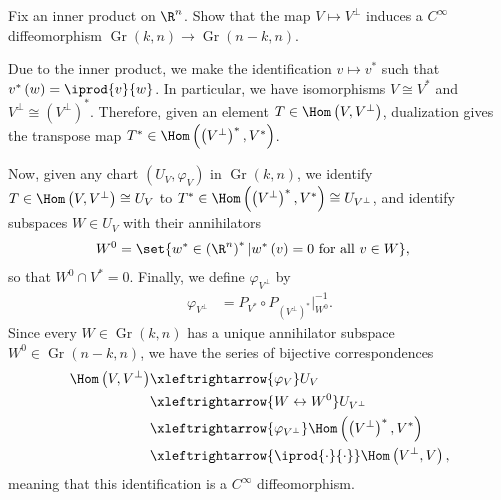 \documentclass[10pt]{mypackage}
\begin{document}
\begin{problem}[Problem 2]
  Fix an inner product on $\R^n$. Show that the map $V\mapsto V^{\perp}$ induces a $C^{\infty}$ diffeomorphism $\operatorname{Gr}\left( k,n \right)\rightarrow \operatorname{Gr}\left( n-k,n \right)$.
\end{problem}
\begin{solution}
  Due to the inner product, we make the identification $v\mapsto v^{\ast}$ such that $v^{\ast}\left( w \right) = \iprod{v}{w}$. In particular, we have isomorphisms $V\cong V^{\ast}$ and $V^{\perp}\cong \left( V^{\perp} \right)^{\ast}$. Therefore, given an element $T\in \Hom\left( V,V^{\perp} \right)$, dualization gives the transpose map $T^{\ast}\in \Hom\left( \left( V^{\perp} \right)^{\ast},V^{\ast} \right)$.\newline

  Now, given any chart $\left( U_V,\varphi_V \right)$ in $\operatorname{Gr}\left( k,n \right)$, we identify $T\in \Hom\left( V,V^{\perp} \right)\cong U_{V}$ to $T^{\ast}\in \Hom\left( \left( V^{\perp} \right)^{\ast},V^{\ast} \right) \cong U_{V^{\perp}}$, and identify subspaces $W\in U_{V}$ with their annihilators 
  \begin{align*}
    W^{0} &= \set{w^{\ast}\in \left( \R^n \right)^{\ast} | w^{\ast}\left( v \right) = 0\text{ for all }v\in W},
  \end{align*}
  so that $W^{0}\cap V^{\ast} = 0$. Finally, we define $\varphi_{V^{\perp}}$ by
  \begin{align*}
    \varphi_{V^{\perp}} &= P_{V^{\ast}}\circ P_{\left( V^{\perp} \right)^{\ast}}|_{W^{0}}^{-1}.
  \end{align*}
  Since every $W\in \operatorname{Gr}\left( k,n \right)$ has a unique annihilator subspace $W^{0}\in \operatorname{Gr}\left( n-k,n \right)$, we have the series of bijective correspondences
  \begin{align*}
    \Hom\left( V,V^{\perp} \right) &\xleftrightarrow{\varphi_{V}} U_{V}\\
                                   &\xleftrightarrow{W\leftrightarrow W^{0}} U_{V^{\perp}}\\
                                   &\xleftrightarrow{\varphi_{V^{\perp}}} \Hom\left( \left( V^{\perp} \right)^{\ast},V^{\ast} \right)\\
                                   &\xleftrightarrow{ \iprod{\cdot}{\cdot} } \Hom\left( V^{\perp},V \right),
  \end{align*}
  meaning that this identification is a $C^{\infty}$ diffeomorphism.
\end{solution}
\end{document}
